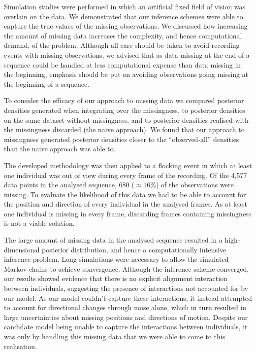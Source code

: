 Simulation studies were performed in which an artificial fixed field of vision
was overlain on the data. We demonstrated that our inference schemes were able
to capture the true values of the missing observations. We discussed how
increasing the amount of missing data increases the complexity, and hence
computational demand, of the problem. Although all care should be taken to
avoid recording events with missing observations, we advised that as data
missing at the end of a sequence could be handled at less computational expense
than data missing in the beginning, emphasis should be put on avoiding
observations going missing at the beginning of a sequence.

To consider the efficacy of our approach to missing data we compared posterior
densities generated when integrating over the missingness, to posterior
densities on the same dataset without missingness, and to posterior densities
realised with the missingness discarded (the naive approach). We found
that our approach to missingness generated posterior densities closer to the
``observed-all'' densities than the naive approach was able to. 

The developed methodology was then applied to a flocking event in which at
least one individual was out of view during every frame of the recording. Of
the 4,577 data points in the analysed sequence, 680 ($\approx16\%$) of the
observations were missing. To evaluate the likelihood of this data we had to be
able to account for the position and direction of every individual in the
analysed frames. As at least one individual is missing in every frame,
discarding frames containing missingness is not a viable solution.

The large amount of missing data in the analysed sequence resulted in a
high-dimensional posterior distribution, and hence a computationally intensive
inference problem. Long simulations were necessary to allow the simulated
Markov chains to achieve convergence. Although the inference scheme converged,
our results showed evidence that there is no explicit alignment interaction
between individuals, suggesting the presence of interactions not accounted for
by our model. As our model couldn't capture these interactions, it instead
attempted to account for directional changes through noise alone, which in turn
resulted in large uncertainties about missing positions and directions of
motion. Despite our candidate model being unable to capture the interactions
between individuals, it was only by handling this missing data that we were
able to come to this realisation.
